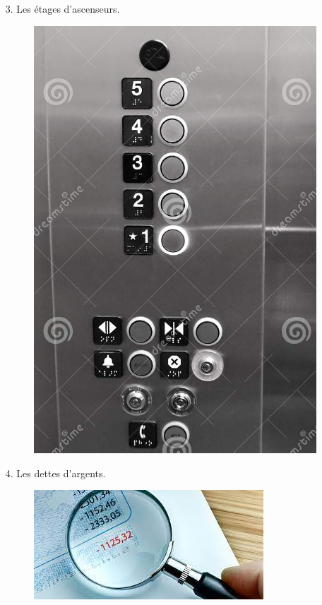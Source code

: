   \begin{multicols}{2}
    \begin{enumerate}
  \item[3.] Les étages d'ascenseurs.
  \begin{figure}[H]
    \centering
    \includegraphics[width=0.8\linewidth]{5x4-relatifs/c-ascenseur.png}
  \end{figure}
  \item[4.] Les dettes d'argents. 
  \begin{figure}[H]
    \centering
    \includegraphics[width=0.8\linewidth]{5x4-relatifs/c-argent.png}
  \end{figure}

\end{enumerate}
\end{multicols}
